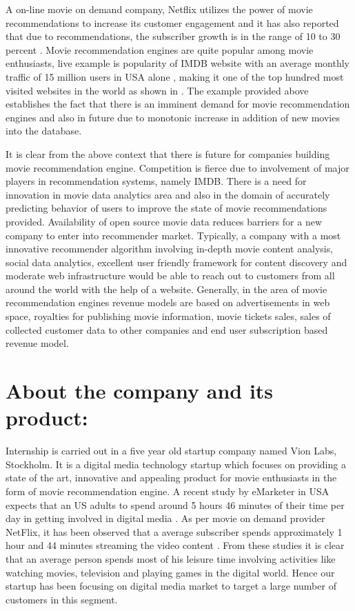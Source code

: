 A on-line movie on demand company, Netflix utilizes the power of movie recommendations to increase its customer engagement and it has also reported that due to recommendations, the subscriber growth is in the range of 10 to 30 percent \citep{Here1}. Movie recommendation engines are quite popular among movie enthusiasts, live example is popularity of \acrshort{IMDB} website with an average monthly traffic of 15 million users in USA alone \citep{Imdb8}, making it one of the top hundred most visited websites in the world as shown in \citep{Alexa5}. The example provided above establishes the fact that there is an imminent demand for movie recommendation engines and also in future due to monotonic increase in addition of new movies into the database. 

 It is clear from the above context that there is future for companies building movie recommendation engine. Competition is fierce due to involvement of major players in recommendation systems, namely \acrshort{IMDB}. There is a need for innovation in movie data analytics area and also in the domain of accurately predicting behavior of users to improve the state of movie recommendations provided. Availability of open source movie data reduces barriers for a new company to enter into recommender market. Typically, a company with a most innovative recommender algorithm involving in-depth movie content analysis, social data analytics, excellent user friendly framework for content discovery and moderate web infrastructure would be able to reach out to customers from all around the world with the help of a website. Generally, in the area of movie recommendation engines revenue models are based on advertisements in web space, royalties for publishing movie information, movie tickets sales, sales of collected customer data to other companies and end user subscription based revenue model.       

\section{About the company and its product:}
 Internship is carried out in a five year old startup company named Vion Labs, Stockholm. It is a digital media technology startup which focuses on providing a state of the art, innovative and appealing product for movie enthusiasts in the form of movie recommendation engine. A recent study by eMarketer in USA expects that an US adults to spend around 5 hours 46 minutes of their time per day in getting involved in digital media \citep{Mobil1}. As per movie on demand provider NetFlix, it has been observed that a average subscriber spends approximately 1 hour and 44 minutes streaming the video content \citep{HowM2}. From these studies it is clear that an average person spends most of his leisure time involving activities like watching movies, television and playing games in the digital world. Hence our startup has been focusing on digital media market to target a large number of customers in this segment. 

